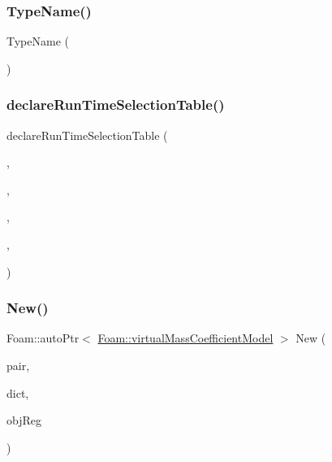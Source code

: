 \subsubsection{\texorpdfstring{Type\+Name()}{TypeName()}}
{\footnotesize\ttfamily Type\+Name (\begin{DoxyParamCaption}\item[{\char`\"{}virtual\+Mass\+Coefficient\+Model\char`\"{}}]{ }\end{DoxyParamCaption})}

\mbox{\label{classFoam_1_1virtualMassCoefficientModel_ac2a5f5dbc6c3909a8b94d4eb20b3e886}} 
\subsubsection{\texorpdfstring{declare\+Run\+Time\+Selection\+Table()}{declareRunTimeSelectionTable()}}
{\footnotesize\ttfamily declare\+Run\+Time\+Selection\+Table (\begin{DoxyParamCaption}\item[{auto\+Ptr}]{,  }\item[{\hyperlink{classFoam_1_1virtualMassCoefficientModel}{virtual\+Mass\+Coefficient\+Model}}]{,  }\item[{virtual\+Mass\+Coefficient\+Models}]{,  }\item[{(const \hyperlink{classFoam_1_1FFPair}{F\+F\+Pair} \&pair, const dictionary \&dict, const object\+Registry \&obj\+Reg)}]{,  }\item[{(pair, dict, obj\+Reg)}]{ }\end{DoxyParamCaption})}

\mbox{\label{classFoam_1_1virtualMassCoefficientModel_aefcea09c36590e0ae882b41fd51f0589}} 
\subsubsection{\texorpdfstring{New()}{New()}}
{\footnotesize\ttfamily Foam\+::auto\+Ptr$<$ \hyperlink{classFoam_1_1virtualMassCoefficientModel}{Foam\+::virtual\+Mass\+Coefficient\+Model} $>$ New (\begin{DoxyParamCaption}\item[{const \hyperlink{classFoam_1_1FFPair}{F\+F\+Pair} \&}]{pair,  }\item[{const dictionary \&}]{dict,  }\item[{const object\+Registry \&}]{obj\+Reg }\end{DoxyParamCaption})\hspace{0.3cm}{\ttfamily [static]}}



